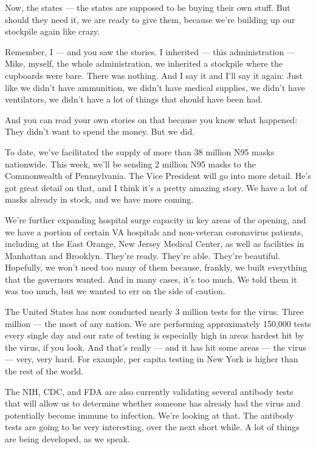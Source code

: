 Now, the states --- the states are supposed to be buying their own
stuff. But should they need it, we are ready to give them, because we're
building up our stockpile again like crazy.

Remember, I --- and you saw the stories. I inherited --- this
administration --- Mike, myself, the whole administration, we inherited
a stockpile where the cupboards were bare. There was nothing. And I say
it and I'll say it again: Just like we didn't have ammunition, we didn't
have medical supplies, we didn't have ventilators, we didn't have a lot
of things that should have been had.

And you can read your own stories on that because you know what
happened: They didn't want to spend the money. But we did.

To date, we've facilitated the supply of more than 38 million N95 masks
nationwide. This week, we'll be sending 2 million N95 masks to the
Commonwealth of Pennsylvania. The Vice President will go into more
detail. He's got great detail on that, and I think it's a pretty amazing
story. We have a lot of masks already in stock, and we have more coming.

We're further expanding hospital surge capacity in key areas of the
opening, and we have a portion of certain VA hospitals and non-veteran
coronavirus patients, including at the East Orange, New Jersey Medical
Center, as well as facilities in Manhattan and Brooklyn. They're ready.
They're able. They're beautiful. Hopefully, we won't need too many of
them because, frankly, we built everything that the governors wanted.
And in many cases, it's too much. We told them it was too much, but we
wanted to err on the side of caution.

The United States has now conducted nearly 3 million tests for the
virus. Three million --- the most of any nation. We are performing
approximately 150,000 tests every single day and our rate of testing is
especially high in areas hardest hit by the virus, if you look. And
that's really --- and it has hit some areas --- the virus --- very, very
hard. For example, per capita testing in New York is higher than the
rest of the world.

The NIH, CDC, and FDA are also currently validating several antibody
tests that will allow us to determine whether someone has already had
the virus and potentially become immune to infection. We're looking at
that. The antibody tests are going to be very interesting, over the next
short while. A lot of things are being developed, as we speak.


